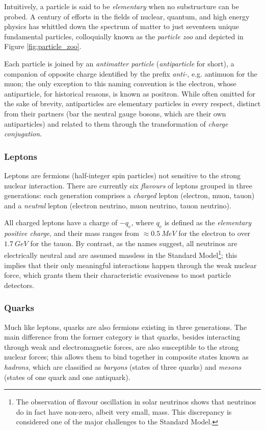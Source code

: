 Intuitively, a particle is said to be \textit{elementary} when no substructure can be probed. 
A century of efforts in the fields of nuclear, quantum, and high energy physics has whittled down the spectrum of matter to just seventeen unique fundamental particles, colloquially known as the \textit{particle zoo} and depicted in Figure \ref{fig:particle_zoo}.

Each particle is joined by an \textit{antimatter particle} (\textit{antiparticle} for short), a companion of opposite charge identified by the prefix \textit{anti-}, e.g. antimuon for the muon; the only exception to this naming convention is the electron, whose antiparticle, for historical reasons, is known as positron.
While often omitted for the sake of brevity, antiparticles are elementary particles in every respect, distinct from their partners (bar the neutral gauge bosons, which are their own antiparticles) and related to them through the transformation of \textit{charge conjugation}.

\subsubsection{Leptons}
Leptons are fermions (half-integer spin particles) not sensitive to the strong nuclear interaction.
There are currently six \textit{flavours} of leptons grouped in three generations: each generation comprises a \textit{charged} lepton (electron, muon, tauon) and a \textit{neutral} lepton (electron neutrino, muon neutrino, tauon neutrino).

All charged leptons have a charge of $-q_e$, where $q_e$ is defined as the \textit{elementary positive charge}, and their mass ranges from $\approx \SI{0.5}{MeV}$ for the electron to over $\SI{1.7}{GeV}$ for the tauon.
By contrast, as the names suggest, all neutrinos are electrically neutral and are assumed massless in the Standard Model\footnote{The observation of flavour oscillation in solar neutrinos shows that neutrinos do in fact have non-zero, albeit very small, mass. This discrepancy is considered one of the major challenges to the Standard Model.}; this implies that their only meaningful interactions happen through the weak nuclear force, which grants them their characteristic evasiveness to most particle detectors.


\subsubsection{Quarks}
Much like leptons, quarks are also fermions existing in three generations. The main difference from the former category is that quarks, besides interacting through weak and electromagnetic forces, are also susceptible to the strong nuclear forces; this allows them to bind together in composite states known as \textit{hadrons}, which are classified as \textit{baryons} (states of three quarks) and \textit{mesons} (states of one quark and one antiquark).

